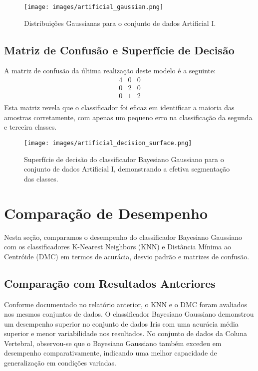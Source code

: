 \documentclass[12pt, a4paper]{report}
\begin{document}
\begin{figure}[H]
\centering
\texttt{[image: images/artificial\_gaussian.png]}
\caption{Distribuições Gaussianas para o conjunto de dados Artificial I.}
\label{fig:gaussian_artificial}
\end{figure}

\subsection{Matriz de Confusão e Superfície de Decisão}
A matriz de confusão da última realização deste modelo é a seguinte:
\[
\begin{array}{ccc}
4 & 0 & 0 \\
0 & 2 & 0 \\
0 & 1 & 2 \\
\end{array}
\]
Esta matriz revela que o classificador foi eficaz em identificar a maioria das amostras corretamente, com apenas um pequeno erro na classificação da segunda e terceira classes.

\begin{figure}[H]
\centering
\texttt{[image: images/artificial\_decision\_surface.png]}
\caption{Superfície de decisão do classificador Bayesiano Gaussiano para o conjunto de dados Artificial I, demonstrando a efetiva segmentação das classes.}
\label{fig:artificial_decision_surface}
\end{figure}


\section{Comparação de Desempenho}
Nesta seção, comparamos o desempenho do classificador Bayesiano Gaussiano com os classificadores K-Nearest Neighbors (KNN) e Distância Mínima ao Centróide (DMC) em termos de acurácia, desvio padrão e matrizes de confusão.

\subsection{Comparação com Resultados Anteriores}
Conforme documentado no relatório anterior, o KNN e o DMC foram avaliados nos mesmos conjuntos de dados. O classificador Bayesiano Gaussiano demonstrou um desempenho superior no conjunto de dados Iris com uma acurácia média superior e menor variabilidade nos resultados. No conjunto de dados da Coluna Vertebral, observou-se que o Bayesiano Gaussiano também excedeu em desempenho comparativamente, indicando uma melhor capacidade de generalização em condições variadas.
\end{document}
